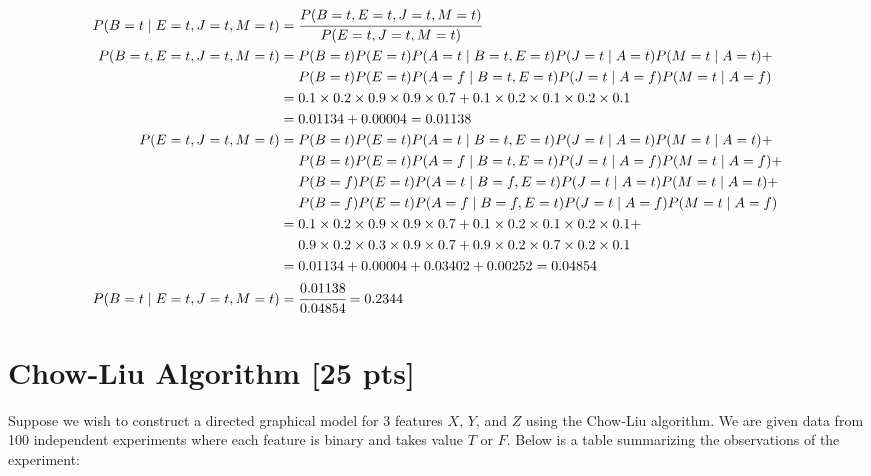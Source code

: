 \documentclass[a4paper]{article}
\theoremstyle{definition}
\newenvironment{soln}{
	\leavevmode\color{blue}\ignorespaces
}{}
\begin{document}
\begin{soln}
	\begin{align*}
		P(B=t \mid E=t,J=t,M=t)&=\cfrac{P(B=t,E=t,J=t,M=t)}{P(E=t,J=t,M=t)}\\
		P(B=t,E=t,J=t,M=t)&=P(B=t)P(E=t) P(A=t \mid B=t,E=t) P(J=t \mid A=t)P(M=t \mid A=t) + \\
						  &\ \ \ \  P(B=t)P(E=t) P(A=f \mid B=t,E=t) P(J=t \mid A=f)P(M=t \mid A=f)\\
						  &=0.1\times 0.2\times 0.9\times 0.9\times 0.7 + 0.1\times 0.2\times 0.1\times 0.2\times 0.1\\
						  &=0.01134 + 0.00004 =0.01138 \\
		P(E=t,J=t,M=t)&=P(B=t)P(E=t) P(A=t \mid B=t,E=t) P(J=t \mid A=t)P(M=t \mid A=t) + \\
					  &\ \ \ \  P(B=t)P(E=t) P(A=f \mid B=t,E=t) P(J=t \mid A=f)P(M=t \mid A=f) + \\
					  &\ \ \ \  P(B=f)P(E=t) P(A=t \mid B=f,E=t) P(J=t \mid A=t)P(M=t \mid A=t) + \\
					  &\ \ \ \  P(B=f)P(E=t) P(A=f \mid B=f,E=t) P(J=t \mid A=f)P(M=t \mid A=f)\\
					  &=0.1\times 0.2\times 0.9\times 0.9\times 0.7 + 0.1\times 0.2\times 0.1\times 0.2\times 0.1 + \\
					  &\ \ \ \  0.9\times 0.2\times 0.3\times 0.9\times 0.7 + 0.9\times 0.2\times 0.7\times 0.2\times 0.1\\
					  &=0.01134 + 0.00004 + 0.03402 + 0.00252 =0.04854 \\
		P(B=t \mid E=t,J=t,M=t)&=\cfrac{0.01138}{0.04854}=0.2344
	\end{align*}
\end{soln}


\section{Chow-Liu Algorithm [25 pts]}
Suppose we wish to construct a directed graphical model for 3 features $X$, $Y$, and $Z$ using the Chow-Liu algorithm. We are given data from 100 independent experiments where each feature is binary and takes value $T$ or $F$. Below is a table summarizing the observations of the experiment:
\end{document}
